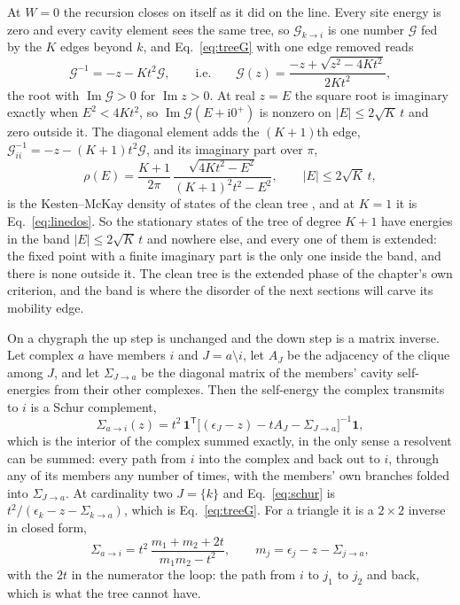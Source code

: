 At $W=0$ the recursion closes on itself as it did on the line. Every site
energy is zero and every cavity element sees the same tree, so
$\mathcal{G}_{k\to i}$ is one number $\mathcal{G}$ fed by the $K$ edges
beyond $k$, and Eq.~\eqref{eq:treeG} with one edge removed reads
\begin{equation}
  \mathcal{G}^{-1}=-z-Kt^{2}\mathcal{G},
  \qquad\text{i.e.}\qquad
  \mathcal{G}(z)=\frac{-z+\sqrt{z^{2}-4Kt^{2}}}{2Kt^{2}},
  \label{eq:cleantree}
\end{equation}
the root with $\operatorname{Im}\mathcal{G}>0$ for $\operatorname{Im}z>0$.
At real $z=E$ the square root is imaginary exactly when $E^{2}<4Kt^{2}$,
so $\operatorname{Im}\mathcal{G}(E+\mathrm{i}0^{+})$ is nonzero on
$|E|\le2\sqrt{K}\,t$ and zero outside it. The diagonal element adds the
$(K+1)$th edge, $\mathcal{G}_{ii}^{-1}=-z-(K+1)t^{2}\mathcal{G}$, and its
imaginary part over $\pi$,
\begin{equation}
  \rho(E)=\frac{K+1}{2\pi}\,
  \frac{\sqrt{4Kt^{2}-E^{2}}}{(K+1)^{2}t^{2}-E^{2}},
  \qquad |E|\le2\sqrt{K}\,t,
  \label{eq:kestenmckay}
\end{equation}
is the Kesten--McKay density of states of the clean tree
\citep{kesten1959,mckay1981}, and at $K=1$ it is Eq.~\eqref{eq:linedos}. So the stationary states of
the tree of degree $K+1$ have energies in the band $|E|\le2\sqrt{K}\,t$
and nowhere else, and every one of them is extended: the fixed point with
a finite imaginary part is the only one inside the band, and there is
none outside it. The clean tree is the extended phase of the chapter's
own criterion, and the band is where the disorder of the next sections
will carve its mobility edge.

On a chygraph the up step is unchanged and the down step is a matrix
inverse. Let complex $a$ have members $i$ and $J=a\setminus i$, let $A_{J}$
be the adjacency of the clique among $J$, and let $\Sigma_{J\to a}$ be the
diagonal matrix of the members' cavity self-energies from their other
complexes. Then the self-energy the complex transmits to $i$ is a Schur
complement,
\begin{equation}
  \Sigma_{a\to i}(z)=t^{2}\,\mathbf{1}^{\mathsf T}
  \bigl[(\epsilon_{J}-z)-t A_{J}-\Sigma_{J\to a}\bigr]^{-1}\mathbf{1},
  \label{eq:schur}
\end{equation}
which is the interior of the complex summed exactly, in the only sense a
resolvent can be summed: every path from $i$ into the complex and back out
to $i$, through any of its members any number of times, with the members'
own branches folded into $\Sigma_{J\to a}$. At cardinality two $J=\{k\}$ and
Eq.~\eqref{eq:schur} is $t^{2}/(\epsilon_{k}-z-\Sigma_{k\to a})$, which is
Eq.~\eqref{eq:treeG}. For a triangle it is a $2\times2$ inverse in closed
form,
\begin{equation}
  \Sigma_{a\to i}=t^{2}\,\frac{m_{1}+m_{2}+2t}{m_{1}m_{2}-t^{2}},
  \qquad m_{j}=\epsilon_{j}-z-\Sigma_{j\to a},
  \label{eq:triangleG}
\end{equation}
with the $2t$ in the numerator the loop: the path from $i$ to $j_{1}$ to
$j_{2}$ and back, which is what the tree cannot have.

